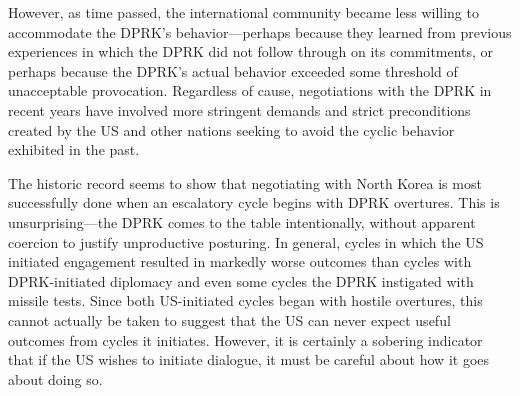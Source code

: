 However, as time passed, the international community became less willing to accommodate the DPRK's behavior---perhaps because they learned from previous experiences in which the DPRK did not follow through on its commitments, or perhaps because the DPRK's actual behavior exceeded some threshold of unacceptable provocation. Regardless of cause, negotiations with the DPRK in recent years have involved more stringent demands and strict preconditions created by the US and other nations seeking to avoid the cyclic behavior exhibited in the past.

The historic record seems to show that negotiating with North Korea is most successfully done when an escalatory cycle begins with DPRK overtures. This is unsurprising---the DPRK comes to the table intentionally, without apparent coercion to justify unproductive posturing. In general, cycles in which the US initiated engagement resulted in markedly worse outcomes than cycles with DPRK-initiated diplomacy and even some cycles the DPRK instigated with missile tests. Since both US-initiated cycles began with hostile overtures, this cannot actually be taken to suggest that the US can never expect useful outcomes from cycles it initiates. However, it is certainly a sobering indicator that if the US wishes to initiate dialogue, it must be careful about how it goes about doing so.
